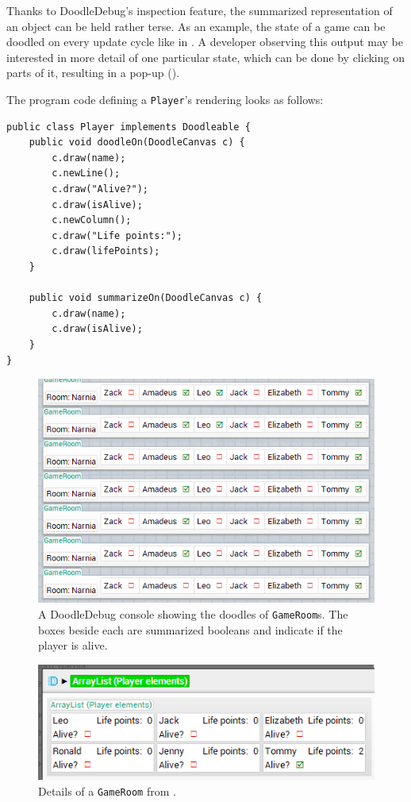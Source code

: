 \documentclass[english]{scrartcl}
\newcommand{\DD}{Dood\-le\-De\-bug\xspace}
\begin{document}
Thanks to \DD's inspection feature, the summarized representation of an object can be held rather terse.
As an example, the state of a game can be doodled on every update cycle like in .
A developer observing this output may be interested in more detail of one particular state, which can be done by clicking on parts of it, resulting in a pop-up ().

The program code defining a \texttt{Player}'s rendering looks as follows:
\begin{lstlisting}
public class Player implements Doodleable {
	public void doodleOn(DoodleCanvas c) {
		c.draw(name);
		c.newLine();
		c.draw("Alive?");
		c.draw(isAlive);
		c.newColumn();
		c.draw("Life points:");
		c.draw(lifePoints);
	}

	public void summarizeOn(DoodleCanvas c) {
		c.draw(name);
		c.draw(isAlive);
	}
}
\end{lstlisting}

\begin{figure}[h]
	\includegraphics[width=\linewidth]{img/game_long-list.png}
	\caption[Example of a chronological sequence: Game]{A DoodleDebug console showing the doodles of \texttt{GameRoom}s. The boxes beside each are summarized booleans and indicate if the player is alive.}
\end{figure}

\begin{figure}[h]
	\centering
	\includegraphics{img/game_last-state.png}
	\caption[Example of a chronological sequence: Detailed player list]{Details of a \texttt{GameRoom} from .}
\end{figure}
\end{document}
